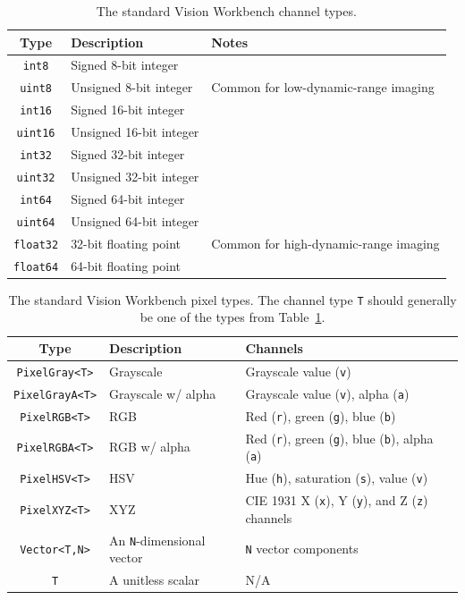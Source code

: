 \begin{table}[t]\begin{centering}
\begin{tabular}{|c|l|l|} \hline
Type & Description & Notes \\ \hline \hline
\verb#int8# & Signed 8-bit integer & \\ \hline
\verb#uint8# & Unsigned 8-bit integer & Common for low-dynamic-range imaging \\ \hline
\verb#int16# & Signed 16-bit integer & \\ \hline
\verb#uint16# & Unsigned 16-bit integer & \\ \hline
\verb#int32# & Signed 32-bit integer & \\ \hline
\verb#uint32# & Unsigned 32-bit integer & \\ \hline
\verb#int64# & Signed 64-bit integer & \\ \hline
\verb#uint64# & Unsigned 64-bit integer & \\ \hline
\verb#float32# & 32-bit floating point & Common for high-dynamic-range imaging \\ \hline
\verb#float64# & 64-bit floating point & \\ \hline
\end{tabular}
\caption{The standard Vision Workbench channel types.}
\label{tbl:channel-types}
\end{centering}\end{table}

\begin{table}[t]\begin{centering}
\begin{tabular}{|c|l|l|} \hline
Type & Description & Channels \\ \hline \hline
\verb#PixelGray<T># & Grayscale & Grayscale value (\verb#v#) \\ \hline
\verb#PixelGrayA<T># & Grayscale w/ alpha & Grayscale value (\verb#v#), alpha (\verb#a#) \\ \hline
\verb#PixelRGB<T># & RGB & Red (\verb#r#), green (\verb#g#), blue (\verb#b#) \\ \hline
\verb#PixelRGBA<T># & RGB w/ alpha &  Red (\verb#r#), green (\verb#g#), blue (\verb#b#), alpha (\verb#a#) \\ \hline
\verb#PixelHSV<T># & HSV & Hue (\verb#h#), saturation (\verb#s#), value (\verb#v#) \\ \hline
\verb#PixelXYZ<T># & XYZ & CIE 1931 X (\verb#x#), Y (\verb#y#), and Z (\verb#z#) channels \\ \hline
\verb#Vector<T,N># & An \verb#N#-dimensional vector & \verb#N# vector components \\ \hline
\verb#T# & A unitless scalar & N/A \\ \hline
\end{tabular}
\caption{The standard Vision Workbench pixel types.  The channel 
type {\tt T} should generally be one of the types from Table~\ref{tbl:channel-types}.}
\label{tbl:pixel-types}
\end{centering}\end{table}

